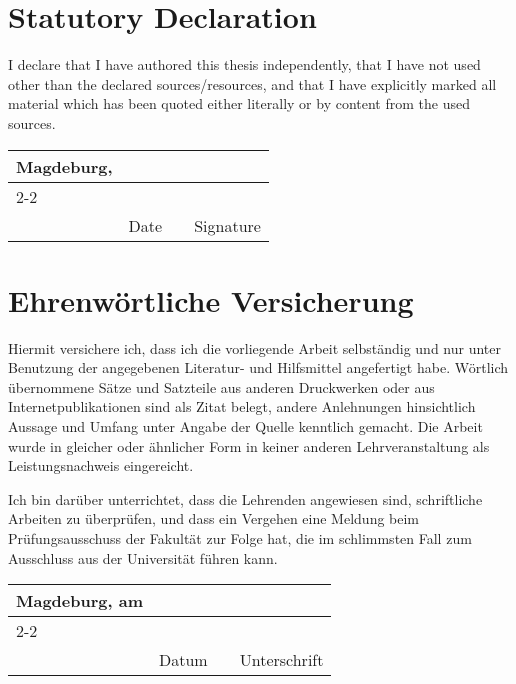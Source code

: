 
\section*{Statutory Declaration}

I declare that I have authored this thesis independently, that I have
not used other than the declared sources/resources, and that I have
explicitly marked all material which has been quoted either literally
or by content from the used sources.

\vfill

\newcommand{\mysignatureblock}[3]{%
  \begin{tabular}{llp{2em}l} 
  #1 & \hspace{3cm}        & & \hspace{56mm} \\\cline{2-2}\cline{4-4}
     &                     & & \\[-3mm]
     & {\footnotesize #2}  & & {\footnotesize #3}
  \end{tabular}
}

\mysignatureblock{Magdeburg,}{Date}{Signature}

\newpage


\section*{Ehrenw\"ortliche Versicherung}


Hiermit versichere ich, dass ich die vorliegende Arbeit selbst\"andig und nur unter Benutzung der
angegebenen Literatur- und Hilfsmittel angefertigt habe. W\"ortlich \"ubernommene S\"atze und
Satzteile aus anderen Druckwerken oder aus Internetpublikationen sind als Zitat belegt, andere
Anlehnungen hinsichtlich Aussage und Umfang unter Angabe der Quelle kenntlich gemacht. Die
Arbeit wurde in gleicher oder ähnlicher Form in keiner anderen Lehrveranstaltung als
Leistungsnachweis eingereicht.

Ich bin dar\"uber unterrichtet, dass die Lehrenden angewiesen sind, schriftliche Arbeiten zu
überprüfen, und dass ein Vergehen eine Meldung beim Prüfungsausschuss der Fakult\"at zur Folge
hat, die im schlimmsten Fall zum Ausschluss aus der Universit\"at f\"uhren kann.

\vfill

\mysignatureblock{Magdeburg, am}{Datum}{Unterschrift}


\newpage

